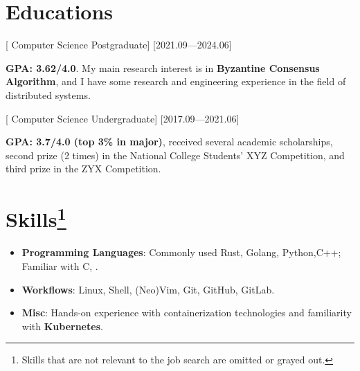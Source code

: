\documentclass{resume}
\begin{document}


\ResumeTitle


\section*{Educations}

[ \textnormal{Computer Science}  Postgraduate]
[2021.09—2024.06]

\textbf{GPA: 3.62/4.0}. My main research interest 
is in \textbf{Byzantine Consensus Algorithm}, 
and I have some research and engineering experience in the field of distributed systems.

[ \textnormal{Computer Science} Undergraduate]
[2017.09—2021.06]

\textbf{GPA: 3.7/4.0 (top 3\% in major)}, received several academic scholarships, second prize (2 times) in the National College Students' XYZ Competition, and third prize in the ZYX Competition.

\section*{Skills\protect\footnote{Skills that are not relevant to the job search are omitted or grayed out.}}

\begin{itemize}
  \item \textbf{Programming Languages}: Commonly used Rust, Golang, Python,C++; Familiar with C, .
  \item \textbf{Workflows}: Linux, Shell, (Neo)Vim, Git, GitHub, GitLab.
  \item \textbf{Misc}: Hands-on experience with containerization technologies and familiarity with \textbf{Kubernetes}.
\end{itemize}
\end{document}

